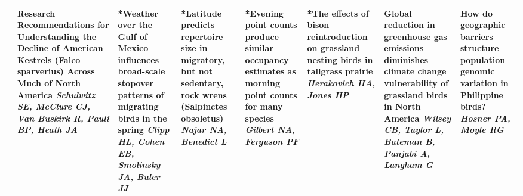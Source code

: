 \begin{tabular}{|x{0.85cm}|x{2.85cm}|x{2.85cm}|x{2.85cm}|x{2.85cm}|x{2.85cm}|a{2.85cm}|a{2.85cm}|}
&Research Recommendations for Understanding the Decline of American Kestrels (Falco sparverius) Across Much of North America \newline \newline \textit{Schulwitz SE, McClure CJ, Van Buskirk R, Pauli BP, Heath JA} & *Weather over the Gulf of Mexico influences broad-scale stopover patterns of migrating birds in the spring \newline \newline \textit{Clipp HL, Cohen EB, Smolinsky JA, Buler JJ} & *Latitude predicts repertoire size in migratory, but not sedentary, rock wrens (Salpinctes obsoletus) \newline \newline \textit{Najar NA, Benedict L} & *Evening point counts produce similar occupancy estimates as morning point counts for many species \newline \newline \textit{Gilbert NA, Ferguson PF} & *The effects of bison reintroduction on grassland nesting birds in tallgrass prairie \newline \newline \textit{Herakovich HA, Jones HP} & Global reduction in greenhouse gas emissions diminishes climate change vulnerability of grassland birds in North America \newline \newline \textit{Wilsey CB, Taylor L, Bateman B, Panjabi A, Langham G} & How do geographic barriers structure population genomic variation in Philippine birds? \newline \newline \textit{Hosner PA, Moyle RG}\\
\hline

\end{tabular}
